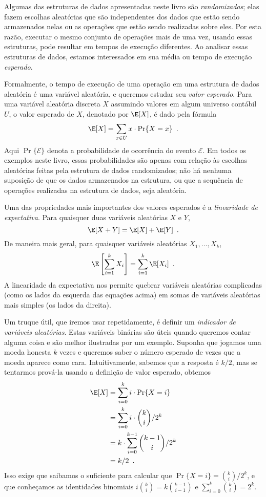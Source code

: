 %
%
%
%
Algumas das estruturas de dados apresentadas neste livro são \emph{randomizadas}; elas fazem 
escolhas aleatórias que são independentes dos dados que estão sendo armazenados nelas ou as 
operações que estão sendo realizadas sobre eles. Por esta razão, executar o mesmo conjunto 
de operações mais de uma vez, usando essas estruturas, pode resultar em tempos de execução 
diferentes. Ao analisar essas estruturas de dados, estamos interessados em sua média ou 
tempo de execução \emph{esperado}.
%
%

Formalmente, o tempo de execução de uma operação em uma estrutura de dados aleatória é uma variável aleatória, e queremos estudar seu \emph{valor esperado}. 
%
Para uma variável aleatória discreta $X$ assumindo valores em algum universo contábil $U$, 
o valor esperado de $X$, denotado por $\E[X]$, é dado pela fórmula
\[
\E[X] = \sum_{x\in U} x\cdot\Pr\{X=x\} \enspace .
\]
Aqui $\Pr\{\mathcal{E}\}$ denota a probabilidade de ocorrência do evento 
$\mathcal{E}$. Em todos os exemplos neste livro, essas probabilidades são apenas com relação às escolhas aleatórias feitas pela estrutura de dados randomizados; não há nenhuma suposição de que os dados armazenados na estrutura, ou que a sequência de operações realizadas na estrutura de dados, seja aleatória.

Uma das propriedades mais importantes dos valores esperados é a \emph{linearidade de 
	expectativa}.  
Para quaisquer duas variáveis aleatórias $X$ e $Y$,
\[
\E[X+Y] = \E[X] + \E[Y] \enspace .
\]
De maneira mais geral, para quaisquer variáveis aleatórias $X_1,\ldots,X_k$,
\[
\E\left[\sum_{i=1}^k X_i\right] = \sum_{i=1}^k \E[X_i] \enspace .
\]
A linearidade da expectativa nos permite quebrar variáveis aleatórias complicadas (como os 
lados da esquerda das equações acima) em somas de variáveis aleatórias mais simples (os lados da direita).

Um truque útil, que iremos usar repetidamente, é definir um \emph{indicador de variáveis aleatórias}.
%
Estas variáveis binárias são úteis quando queremos contar alguma coisa e são melhor 
ilustradas por um exemplo. Suponha que jogamos uma moeda honesta $k$ vezes e queremos 
saber o número esperado de vezes que a moeda aparece como cara.
%
Intuitivamente, sabemos que a resposta é $k/2$, mas se tentarmos prová-la usando a definição de valor esperado, obtemos
\begin{align*}
\E[X] & = \sum_{i=0}^k i\cdot\Pr\{X=i\} \\
& = \sum_{i=0}^k i\cdot\binom{k}{i}/2^k \\
& = k\cdot \sum_{i=0}^{k-1}\binom{k-1}{i}/2^k \\
& = k/2 \enspace .
\end{align*}
Isso exige que saibamos o suficiente para calcular que $\Pr\{X=i\}
= \binom{k}{i}/2^k$, e que conheçamos as identidades binomiais
$i\binom{k}{i}=k\binom{k-1}{i-1}$ e $\sum_{i=0}^{k} \binom{k}{i} = 2^{k}$.


